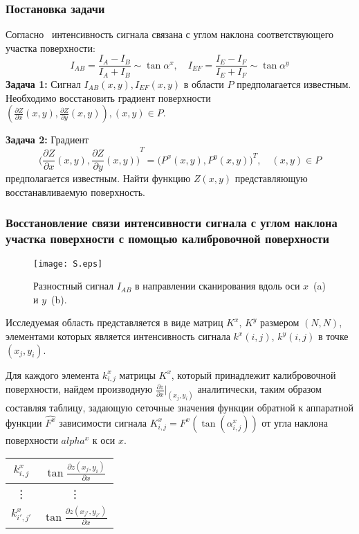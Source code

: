 \documentclass{beamer}
\begin{document}
\begin{frame}
    \frametitle{Постановка задачи}
    Согласно~\cite{PaluszynskiSlowko2005Vacuum, DrzazgaPaluszynski2005Measurement} интенсивность сигнала связана с углом наклона соответствующего участка поверхности:
    $$ I_{AB} = \frac{I_A - I_B}{I_A + I_B} \sim \tan{\alpha^x}, \quad I_{EF} = \frac{I_E - I_F}{I_E + I_F} \sim \tan{\alpha^y} $$
    \textbf{Задача 1:} Сигнал $I_{AB}(x,y), I_{EF}(x,y)$ в области $P$ предполагается известным. Необходимо восстановить градиент поверхности $\left(\frac{\partial Z}{\partial x}(x,y), \frac{\partial Z}{\partial y} (x,y) \right), (x,y) \in P$.

    \vfill

    \textbf{Задача 2:} Градиент
    \begin{equation}
        {\Big(\frac{\partial Z}{\partial x}(x,y),
        \frac{\partial Z}{\partial y} (x,y)\Big)}^{T} =
        {\big(P^x(x,y), P^y(x,y)\big)}^T, \quad (x,y) \in P
    \end{equation}
    предполагается известным. Найти функцию $Z(x,y)$ представляющую восстанавливаемую поверхность.
\end{frame}

\begin{frame}[allowframebreaks]
    \frametitle{Восстановление связи интенсивности сигнала с углом наклона участка поверхности с помощью калибровочной поверхности}


    \begin{figure}[hp]
        \texttt{[image: S.eps]}
        \caption{\small Разностный сигнал $I_{AB}$ в направлении сканирования вдоль оси $x$~(a) и $y$~(b).}
        {\label{fig:inputSphere}}%
    \end{figure}

    \newpage
    Исследуемая область представляется в виде матриц $K^x$, $K^y$ размером $(N,N)$, элементами которых является интенсивность сигнала $k^x (i,j)$, $k^y (i,j)$ в точке $(x_j, y_i)$.

    Для каждого элемента $k^x_{i,j}$ матрицы $K^x$, который принадлежит калибровочной поверхности, найдем производную $\frac{\partial z}{\partial x} \big|_{(x_j,y_i)} $ аналитически, таким образом составляя таблицу, задающую сеточные значения функции обратной к аппаратной функции $\hat{F^x}$ зависимости сигнала $K^x_{i,j} = F^x (\tan(\alpha^x_{i,j}))$ от угла наклона поверхности $alpha^x$ к оси $x$.
    \begin{center}
        \begin{tabular}{| c| c |}
            \hline
            $ k^x_{i,j} $ & $ \tan{ \frac{\partial z(x_j, y_i)}{\partial x} } $ \\
            \hline
            \vdots          & \vdots \\
            \hline
            $ k^x_{i',j'} $ & $ \tan{ \frac{\partial z(x_{j'}, y_{i'})}{\partial x} } $ \\
            \hline
        \end{tabular}
    \end{center}

\end{frame}
\end{document}
